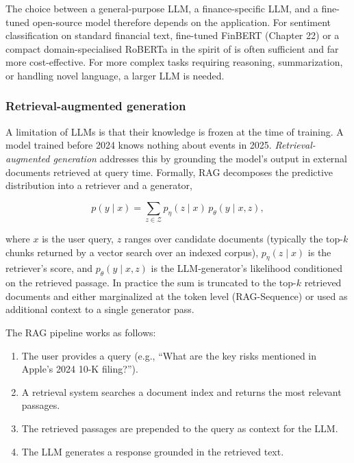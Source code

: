 The choice between a general-purpose LLM, a finance-specific LLM, and a fine-tuned open-source model therefore depends on the application. For sentiment classification on standard financial text, fine-tuned FinBERT (Chapter 22) or a compact domain-specialised RoBERTa in the spirit of \cite{rahimikia2024revisiting} is often sufficient and far more cost-effective. For more complex tasks requiring reasoning, summarization, or handling novel language, a larger LLM is needed.

\subsubsection{Retrieval-augmented generation}

A limitation of LLMs is that their knowledge is frozen at the time of training. A model trained before 2024 knows nothing about events in 2025. \textit{Retrieval-augmented generation} \citep{lewis2020retrieval} addresses this by grounding the model's output in external documents retrieved at query time. Formally, RAG decomposes the predictive distribution into a retriever and a generator,

\begin{equation}
p(y \mid x) = \sum_{z \in \mathcal{Z}} p_\eta(z \mid x)\, p_\theta(y \mid x, z),
\tag{23.4}
\end{equation}

where $x$ is the user query, $z$ ranges over candidate documents (typically the top-$k$ chunks returned by a vector search over an indexed corpus), $p_\eta(z \mid x)$ is the retriever's score, and $p_\theta(y \mid x, z)$ is the LLM-generator's likelihood conditioned on the retrieved passage. In practice the sum is truncated to the top-$k$ retrieved documents and either marginalized at the token level (RAG-Sequence) or used as additional context to a single generator pass.

The RAG pipeline works as follows:

\begin{enumerate}
\item The user provides a query (e.g., ``What are the key risks mentioned in Apple's 2024 10-K filing?'').
\item A retrieval system searches a document index and returns the most relevant passages.
\item The retrieved passages are prepended to the query as context for the LLM.
\item The LLM generates a response grounded in the retrieved text.
\end{enumerate}


